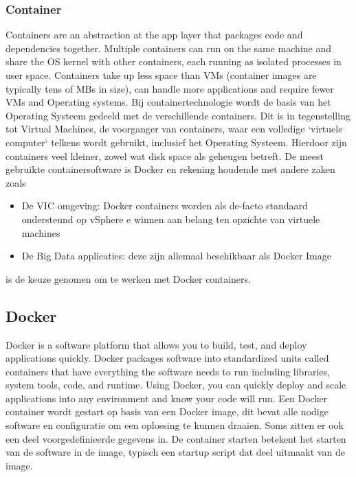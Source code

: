 \subsubsection{Container}
Containers are an abstraction at the app layer that packages code and dependencies together. Multiple containers can run on the same machine and share the OS kernel with other containers, each running as isolated processes in user space. Containers take up less space than VMs (container images are typically tens of MBs in size), can handle more applications and require fewer VMs and Operating systems.\autocite{Docker2023a}
\newline
\newline
Bij containertechnologie wordt de basis van het Operating Systeem gedeeld met de verschillende containers. Dit is in tegenstelling tot Virtual Machines, de voorganger van containers, waar een volledige `virtuele computer` telkens wordt gebruikt, inclusief het Operating Systeem. Hierdoor zijn containers veel kleiner, zowel wat disk space als geheugen betreft.
\newline
\newline
De meest gebruikte containersoftware is Docker en rekening houdende met andere zaken zoals
\begin{itemize}
    \item De VIC omgeving: Docker containers worden als de-facto standaard ondersteund op vSphere e winnen aan belang ten opzichte van virtuele machines
    \item De Big Data applicaties: deze zijn allemaal beschikbaar als Docker Image
\end{itemize}
is de keuze genomen om te werken met Docker containers.

\subsection{Docker}
Docker is a software platform that allows you to build, test, and deploy applications quickly. Docker packages software into standardized units called containers that have everything the software needs to run including libraries, system tools, code, and runtime. Using Docker, you can quickly deploy and scale applications into any environment and know your code will run. \autocite{AwsAmazon2023}
\newline
\newline
Een Docker container wordt gestart op basis van een Docker image, dit bevat alle nodige software en configuratie om een oplossing te kunnen draaien. Soms zitten er ook een deel voorgedefinieerde gegevens in. De container starten betekent het starten van de software in de image, typisch een startup script dat deel uitmaakt van de image.

